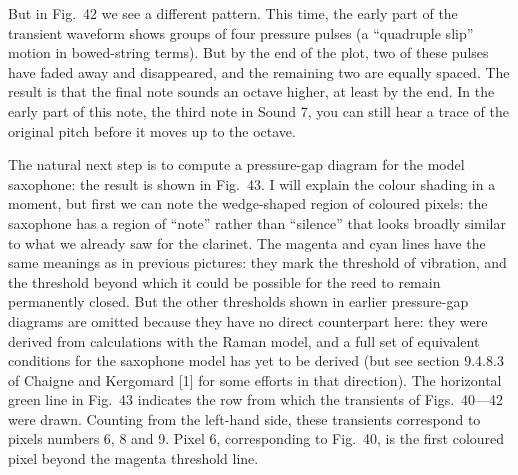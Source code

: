 

  But in Fig.\ 42 we see a different pattern. This time, the early part of the 
  transient waveform shows groups of four pressure pulses (a “quadruple slip” 
  motion in bowed-string terms). But by the end of the plot, two of these 
  pulses have faded away and disappeared, and the remaining two are equally 
  spaced. The result is that the final note sounds an octave higher, at least 
  by the end. In the early part of this note, the third note in Sound 7, you 
  can still hear a trace of the original pitch before it moves up to the 
  octave. 

  The natural next step is to compute a pressure-gap diagram for the model 
  saxophone: the result is shown in Fig.\ 43. I will explain the colour shading 
  in a moment, but first we can note the wedge-shaped region of coloured 
  pixels: the saxophone has a region of “note” rather than “silence” that looks 
  broadly similar to what we already saw for the clarinet. The magenta and cyan 
  lines have the same meanings as in previous pictures: they mark the threshold 
  of vibration, and the threshold beyond which it could be possible for the 
  reed to remain permanently closed. But the other thresholds shown in earlier 
  pressure-gap diagrams are omitted because they have no direct counterpart 
  here: they were derived from calculations with the Raman model, and a full 
  set of equivalent conditions for the saxophone model has yet to be derived 
  (but see section 9.4.8.3 of Chaigne and Kergomard [1] for some efforts in 
  that direction). The horizontal green line in Fig.\ 43 indicates the row from 
  which the transients of Figs.\ 40—42 were drawn. Counting from the left-hand 
  side, these transients correspond to pixels numbers 6, 8 and 9. Pixel 6, 
  corresponding to Fig.\ 40, is the first coloured pixel beyond the magenta 
  threshold line. 


